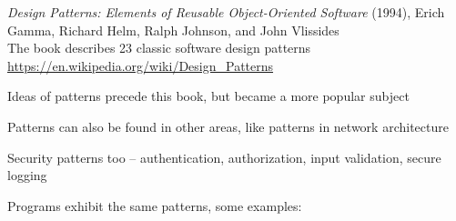 \documentclass[Screen16to9,17pt]{foils}
\begin{document}

\begin{list2}
\item \emph{Design Patterns: Elements of Reusable Object-Oriented Software} (1994), Erich Gamma, Richard Helm, Ralph Johnson, and John Vlissides\\
The book describes 23 classic software design patterns\\
\url{https://en.wikipedia.org/wiki/Design_Patterns}

\item Ideas of patterns precede this book, but became a more popular subject
\item Patterns can also be found in other areas, like patterns in network architecture
\item Security patterns too -- authentication, authorization, input validation, secure logging
\end{list2}



Programs exhibit the same patterns, some examples:



\end{document}
